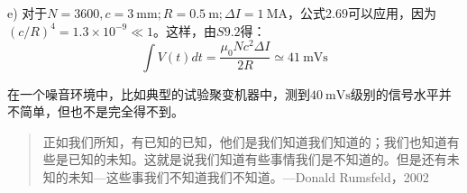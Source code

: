 e) 对于$N = 3600, c = 3\ \mathrm{mm}; R = 0.5\ \mathrm{m}; \Delta I = 1\ \mathrm{MA}$，公式2.69可以应用，因为$(c/R)^4 = 1.3×10^{−9}\ll 1$。这样，由$S9.2$得：
$$\int V(t)dt=\frac{\mu_0 N c^2 \Delta I}{2R}\simeq 41\ \mathrm{mVs}$$

在一个噪音环境中，比如典型的试验聚变机器中，测到$40\ \mathrm{mVs}$级别的信号水平并不简单，但也不是完全得不到。

\begin{quotation}
\kaishu 正如我们所知，有已知的已知，他们是我们知道我们知道的；我们也知道有些是已知的未知。这就是说我们知道有些事情我们是不知道的。但是还有未知的未知---这些事我们不知道我们不知道。---Donald Rumsfeld，2002
\end{quotation}
